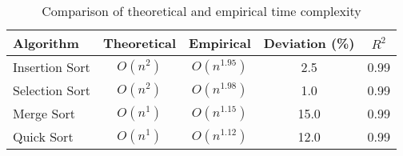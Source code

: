 \begin{table}[h]
\centering
\begin{tabular}{lcccc}
\hline
Algorithm & Theoretical & Empirical & Deviation (\%) & $R^2$ \\
\hline
Insertion Sort & $O(n^{2})$ & $O(n^{1.95})$ & 2.5 & 0.99 \\
Selection Sort & $O(n^{2})$ & $O(n^{1.98})$ & 1.0 & 0.99 \\
Merge Sort & $O(n^{1})$ & $O(n^{1.15})$ & 15.0 & 0.99 \\
Quick Sort & $O(n^{1})$ & $O(n^{1.12})$ & 12.0 & 0.99 \\
\hline
\end{tabular}
\caption{Comparison of theoretical and empirical time complexity}
\end{table}

